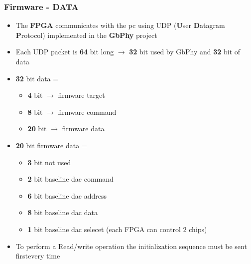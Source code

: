 \documentclass[aspectratio=169]{beamer}
\begin{document}
	\begin{frame}
	\frametitle{Firmware - DATA}
	\begin{itemize}
		\item The \textbf{FPGA} communicates with the pc using UDP (\textbf{U}ser \textbf{D}atagram \textbf{P}rotocol) implemented in the \textbf{GbPhy} project
		\item Each UDP packet is \textbf{64} bit long $\rightarrow$ \textbf{32} bit used by GbPhy and \textbf{32} bit of data
		\item \textbf{32} bit data =
		\begin{itemize}
			\item \textbf{4} bit $\rightarrow$ firmware target
			\item \textbf{8} bit $\rightarrow$ firmware command
			\item \textbf{20} bit $\rightarrow$ firmware data
		\end{itemize}
		\item \textbf{20} bit firmware data =
		\begin{itemize}
			\item \textbf{3} bit not used
			\item \textbf{2} bit baseline dac command
			\item \textbf{6} bit baseline dac address
			\item \textbf{8} bit baseline dac data
			\item \textbf{1} bit baseline dac selecet (each FPGA can control 2 chips)
		\end{itemize}
		\item To perform a Read/write operation the initialization sequence must be sent first\newline every time
	\end{itemize}
	\end{frame}
\end{document}
